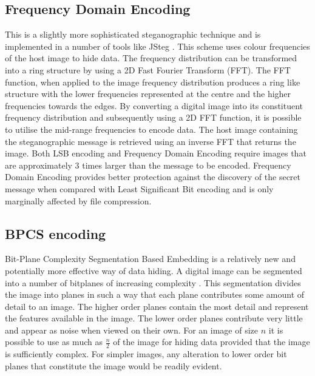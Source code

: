 \subsection{Frequency Domain Encoding} This is a slightly more sophisticated steganographic technique and is implemented in a number of tools like JSteg \cite{jsteg}. This scheme uses colour frequencies of the host image to hide data. The frequency distribution can be transformed into a ring structure by using a 2D Fast Fourier Transform (FFT). The FFT function, when applied to the image frequency distribution produces a ring like structure with the lower frequencies represented at the centre and the higher frequencies towards the edges. By converting a digital image into its constituent frequency distribution and subsequently using a 2D FFT function, it is possible to utilise the mid-range frequencies to encode data. The host image containing the steganographic message is retrieved using an inverse FFT that returns the image. Both LSB encoding and Frequency Domain Encoding require images that are approximately 3 times larger than the message to be encoded. Frequency Domain Encoding provides better protection against the discovery of the secret message when compared with Least Significant Bit encoding and is only marginally affected by file compression. 
\subsection{BPCS encoding} Bit-Plane Complexity Segmentation Based Embedding is a relatively new and potentially more effective way of data hiding.  A digital image can be segmented into a number of bitplanes of increasing complexity \cite{kawaguchi1998concept}. This segmentation divides the image into planes in such a way that each plane contributes some amount of detail to an image. The higher order planes contain the most detail and represent the features available in the image. The lower order planes contribute very little and appear as noise when viewed on their own.  For an image of size $n$ it is possible to use as much as $\frac{n}{2}$ of the image for hiding data provided that the image is sufficiently complex. For simpler images, any alteration to lower order bit planes that constitute the image would be readily evident.
